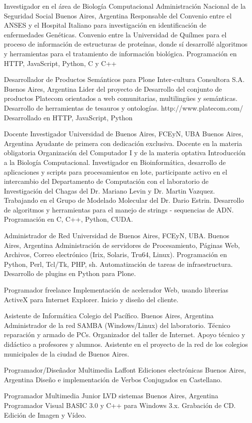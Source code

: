 	{Investigador en el área de Biología Computacional}
	{Administración Nacional de la Seguridad Social}
	{Buenos Aires, Argentina}
	{}
	{Responsable del Convenio entre el ANSES y el Hospital Italiano para investigación
	en identificación de enfermedades Genéticas. Convenio entre la
	Universidad de Quílmes para el proceso de información de estructuras de proteínas,
	donde sí desarrollé algoritmos y herramientas para el tratamiento de información biológica.
        Programación en HTTP, JavaScript, Python, C y C++}

	{Desarrollador de Productos Semánticos para Plone}
	{Inter-cultura Consultora S.A.}
	{Buenos Aires, Argentina}
	{}
	{Lider del proyecto de Desarrollo del conjunto de productos Platecom
	orientados a web comunitarias, multilingües y semánticas. Desarrollo
	de herramientas de tesauros y ontologías. http://www.platecom.com/
        Desarrollado en HTTP, JavaScript, Python}

	{Docente Investigador}
	{Universidad de Buenos Aires, FCEyN, UBA}
	{Buenos Aires, Argentina}
	{}
	{Ayudante de primera con dedicación exclusiva.
	Docente en la materia obligatoria Organización del Computador I y de la
	materia optativa Introducción a la Biología Computacional.
	Investigador en Bioinformática, desarrollo de aplicaciones y scripts para
	procesamientos en lote, participante activo en el intercambio del Departamento
	de Computación con el laboratorio de Investigación del Chagas del
	Dr. Mariano Levin y Dr. Martin Vazquez. Trabajando en el Grupo de Modelado Molecular
	del Dr. Dario Estrin.
        Desarrollo de algoritmos y herramientas para el manejo de strings - sequencias de ADN.
        Programación en C, C++, Python, CUDA.}

	{Administrador de Red}
	{Universidad de Buenos Aires, FCEyN, UBA.}
	{Buenos Aires, Argentina}
	{}
	{Administración de servidores de Procesamiento, Páginas Web,
	Archivos, Correo electrónico (Irix, Solaris, Tru64, Linux).
	Programación en Python, Perl, Tcl/Tk, PHP, sh.
	Automatización de tareas de infraestructura.
        Desarrollo de plugins en Python para Plone.}

	{Programador freelance}
	{}
	{}
	{}
	{Implementación de acelerador Web, usando librerias ActiveX para Internet Explorer. Inicio y diseño del cliente.}

	{Asistente de Informática}
	{Colegio del Pacífico.}
	{Buenos Aires, Argentina}
	{}
	{Administrador de la red SAMBA (Windows/Linux) del
	laboratorio. Técnico reparación y armado de PCs. Organizador del taller de
	Internet. Apoyo técnico y didáctico a profesores y alumnos. Asistente en el
	proyecto de la red de los colegios municipales de la ciudad de Buenos Aires.}

	{Programador/Diseñador Multimedia}
	{Laffont Ediciones electrónicas}
	{Buenos Aires, Argentina}
	{}
	{Diseño e implementación de Verbos Conjugados en Castellano.}

	{Programador Multimedia Junior}
	{LVD sistemas}
	{Buenos Aires, Argentina}
	{}
	{Programador Visual BASIC 3.0 y C++ para Windows 3.x. Grabación de CD. Edición de Imagen y Vídeo.}


